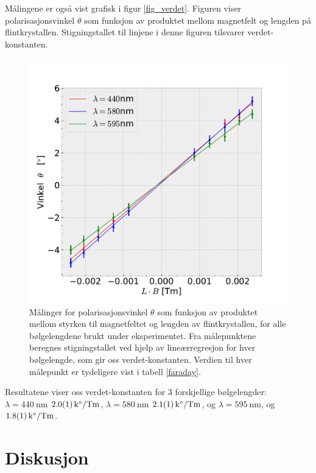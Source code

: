 \documentclass[%
 reprint,
 amsmath,amssymb,
 aps,
 norsk,
]{revtex4-1}
\begin{document}
Målingene er også vist grafisk i figur \vref{fig_verdet}. Figuren viser polarisasjonsvinkel $\theta$ som funksjon av produktet mellom magnetfelt og lengden på flintkrystallen. Stigningstallet til linjene i denne figuren tilsvarer verdet-konstanten.
\begin{figure}[ht!]
  \centering
  \includegraphics[scale=0.45]{faraday_effekt.pdf}
  \caption{Målinger for polarisasjonsvinkel $\theta$ som funksjon av produktet mellom styrken til magnetfeltet og lengden av flintkrystallen, for alle bølgelengdene brukt under eksperimentet. Fra målepunktene beregnes stigningstallet ved hjelp av lineærregresjon for hver bølgelengde, som gir oss verdet-konstanten. Verdien til hver målepunkt er tydeligere vist i tabell \vref{faraday}.}
  \label{fig_verdet}
\end{figure}
Resultatene viser oss verdet-konstanten for $3$ forskjellige bølgelengder: $\lambda = \SI{440}{\nano\meter}$ $\SI{2.0\pm0.1}{\kilo\degree/\tesla\meter}$, $\lambda = \SI{580}{\nano\meter}$ $\SI{2.1\pm0.1}{\kilo\degree/\tesla\meter}$, og $\lambda = \SI{595}{\nano\meter}$,
 og $\SI{1.8\pm0.1}{\kilo\degree/\tesla\meter}$.
\section{Diskusjon}
\end{document}
